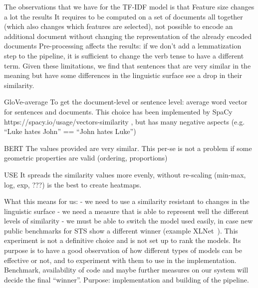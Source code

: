 The observations that we have for the TF-IDF model is that
Feature size changes a lot the results
It requires to be computed on a set of documents all together (which also changes which features are selected), not possible to encode an additional document without changing the representation of the already encoded documents
Pre-processing affects the results: if we don’t add a lemmatization step to the pipeline, it is sufficient to change the verb tense to have a different term.
Given these limitations, we find that sentences that are very similar in the meaning but have some differences in the linguistic surface see a drop in their similarity.

GloVe-average
To get the document-level or sentence level: average word vector for sentences and documents. This choice has been implemented by SpaCy https://spacy.io/usage/vectors-similarity , but has many negative aspects (e.g. “Luke hates John” == “John hates Luke”) 

BERT
The values provided are very similar. This per-se is not a problem if some geometric properties are valid (ordering, proportions)

USE
It spreads the similarity values more evenly, without re-scaling (min-max, log, exp, ???) is the best to create heatmaps.



What this means for us:
- we need to use a similarity resistant to changes in the linguistic surface
- we need a measure that is able to represent well the different levels of similarity
- we must be able to switch the model used easily, in case new public benchmarks for STS show a different winner (example XLNet~\cite{yang2019xlnet}).
This experiment is not a definitive choice and is not set up to rank the models. Its purpose is to have a good observation of how different types of models can be effective or not, and to experiment with them to use in the implementation.
Benchmark, availability of code and maybe further measures on our system will decide the final ``winner''.
Purpose: implementation and building of the pipeline.


